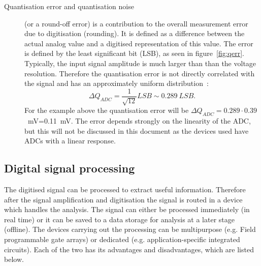\documentclass[twoside,12pt]{packages/mytustyle}  %
\begin{document}
\begin{description}
\item[Quantisation error and quantisation noise] (or a round-off error) is a contribution to the overall measurement error due to digitisation (rounding). It is defined as a difference between the actual analog value and a digitised representation of this value. The error is defined by the least significant bit (LSB), as seen in figure~\ref{fig:qerr}. Typically, the input signal amplitude is much larger than than the voltage resolution. Therefore the quantisation error is not directly correlated with the signal and has an approximately uniform distribution~\cite{}: 
\begin{equation}
\label{eq:qerr}
\Delta Q_{ADC}=\frac{1}{\sqrt{12}}LSB\sim0.289~LSB.
\end{equation} 
For the example above the quantisation error will be $\Delta Q_{ADC}=0.289\cdot 0.39$~mV=0.11~mV. The error depends strongly on the linearity of the ADC, but this will not be discussed in this document as the devices used have ADCs with a linear response.
\end{description}

\subsection{Digital signal processing}
The digitised signal can be processed to extract useful information. Therefore after the signal amplification and digitisation the signal is routed in a device which handles the analysis. The signal can either be processed immediately (in real time) or it can be saved to a data storage for analysis at a later stage (offline). The devices carrying out the processing can be multipurpose (e.g. Field programmable gate arrays) or dedicated (e.g. application-specific integrated circuits). Each of the two has its advantages and disadvantages, which are listed below. 
\end{document}
